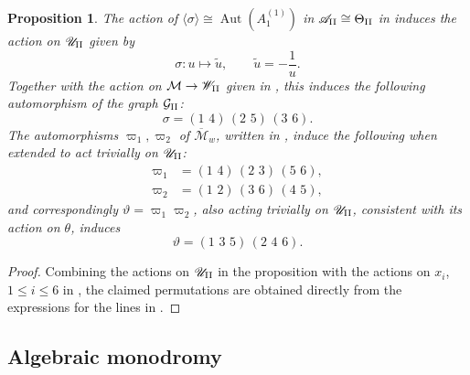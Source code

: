 \documentclass[a4paper,reqno]{amsart}
\numberwithin{equation}{section}
\DeclareMathOperator{\Aut}{Aut}
\newtheorem{proposition}[theorem]{Proposition}
\numberwithin{equation}{section}
\begin{document}
\begin{proposition}
    The action of $\langle\sigma\rangle\cong \Aut(A_1^{(1)})$ in $\mathscr{A}_{\rm{II}}\cong \Theta_{\rm{II}}$ in  induces the action on $\mathscr{U}_{\rm{II}}$ given by 
    $$\sigma: u \mapsto \tilde{u}, \qquad\tilde{u} = - \frac{1}{u}.$$
    Together with the action on $\mathcal{M}\to \mathscr{W}_{\rm{II}}$ given in , this induces the following automorphism of the graph $\mathcal{G}_{\rm{II}}$:
\begin{equation*}
     \sigma = (1\,\,4)\,(2\,\,5)\,(3\,\,6).
\end{equation*}       
The automorphisms $\varpi_1,\varpi_2$ of $\overline{\mathcal{M}}_w$, written in , induce the following when extended to act trivially on $\mathscr{U}_{\rm{II}}$:
\begin{align*}
    \varpi_1 &= (1\,\,4)\,(2\,\,3)\,(5\,\,6),\\
    \varpi_2 &= (1\,\,2)\,(3\,\,6)\,(4\,\,5),
\end{align*} 
and correspondingly $\vartheta=\varpi_1\varpi_2$, also acting trivially on $\mathscr{U}_{\rm{II}}$, consistent with its action on $\theta$, induces
\begin{equation*}
    \vartheta = (1\,\,3\,\,5)\,(2\,\,4\,\,6).
\end{equation*}
\end{proposition}
\begin{proof}
    Combining the actions on $\mathscr{U}_{\rm{II}}$ in the proposition with the actions on $x_i$, $1\leq i\leq 6$ in , the claimed permutations are obtained directly from the expressions for the lines in . 
\end{proof}


\subsection{Algebraic monodromy}
\end{document}

